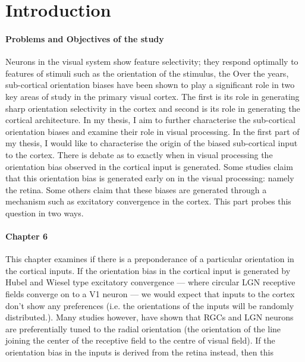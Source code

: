 \chapter{Introduction}

\subsubsection{Problems and Objectives of the study}

Neurons in the visual system show feature selectivity; they respond optimally to features of stimuli such as the orientation of the stimulus, the 
Over the years, sub-cortical orientation biases have been shown to play a significant role in  two key areas of study in the primary visual cortex. The first is its role in generating sharp orientation selectivity in the cortex and second is its role in generating the cortical architecture. In my thesis, I aim to further characterise the sub-cortical orientation biases and examine their role in visual processing. In the first part of my thesis, I would like to characterise the origin of the biased sub-cortical input to the cortex. There is debate as to exactly when in visual processing the orientation bias observed in the cortical input is generated. Some studies claim that this orientation bias is generated early on in the visual processing: namely the retina. Some others claim that these biases are generated through a mechanism such as excitatory convergence in the cortex. This part probes this question in two ways. 

\subsubsection{Chapter 6}

This chapter examines if there is a preponderance of a particular orientation in the cortical inputs. If the orientation bias in the cortical input is generated by Hubel and Wiesel type excitatory convergence --- where circular LGN receptive fields converge on to a V1 neuron --- we would expect that inputs to the cortex don't show any preferences (i.e. the orientations of the inputs will be randomly distributed.). Many studies however, have shown that RGCs and LGN neurons are preferentially tuned to the radial orientation (the orientation of the line joining the center of the receptive field to the centre of visual field). If the orientation bias in the inputs is derived from the retina instead, then this 
	
	